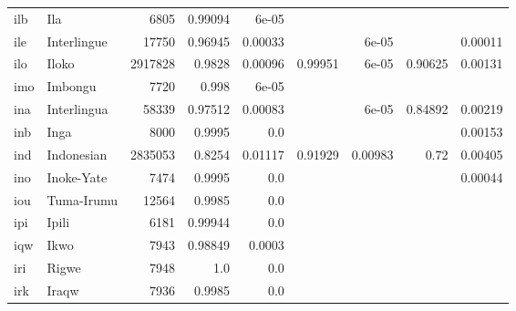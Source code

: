 \documentclass[11pt]{article}
\begin{document}
\begin{table*}[h]
{\begin{tabular}{llrrrrrrr}
ilb         & Ila         & 6805         & 0.99094         & 6e-05         &          &          &          &          \\

ile         & Interlingue         & 17750         & 0.96945         & 0.00033         &          & 6e-05         &          & 0.00011         \\

ilo         & Iloko         & 2917828         & 0.9828         & 0.00096         & 0.99951         & 6e-05         & 0.90625         & 0.00131         \\

imo         & Imbongu         & 7720         & 0.998         & 6e-05         &          &          &          &          \\

ina         & Interlingua         & 58339         & 0.97512         & 0.00083         &          & 6e-05         & 0.84892         & 0.00219         \\

inb         & Inga         & 8000         & 0.9995         & 0.0         &          &          &          & 0.00153         \\

ind         & Indonesian         & 2835053         & 0.8254         & 0.01117         & 0.91929         & 0.00983         & 0.72         & 0.00405         \\

ino         & Inoke-Yate         & 7474         & 0.9995         & 0.0         &          &          &          & 0.00044         \\

iou         & Tuma-Irumu         & 12564         & 0.9985         & 0.0         &          &          &          &          \\

ipi         & Ipili         & 6181         & 0.99944         & 0.0         &          &          &          &          \\

iqw         & Ikwo         & 7943         & 0.98849         & 0.0003         &          &          &          &          \\

iri         & Rigwe         & 7948         & 1.0         & 0.0         &          &          &          &          \\

irk         & Iraqw         & 7936         & 0.9985         & 0.0         &          &          &          &          \\


\end{tabular}}
\end{table*}
\end{document}
